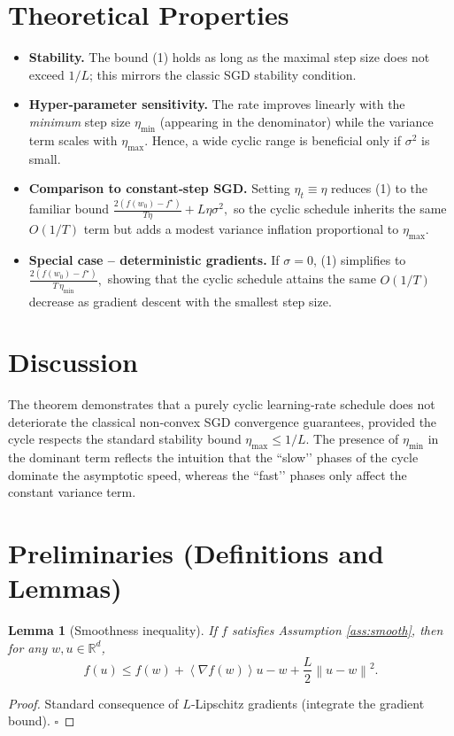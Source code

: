 \documentclass{article}
\newtheorem{lemma}{Lemma}
\newcommand{\R}{\mathbb{R}}
\newcommand{\norm}[1]{\left\lVert #1\right\rVert}
\newcommand{\inner}[1]{\left\langle #1\right\rangle}
\begin{document}
\section*{Theoretical Properties}
\begin{itemize}[leftmargin=*]
\item \textbf{Stability.} The bound (1) holds as long as the maximal step size does not exceed $1/L$; this mirrors the classic SGD stability condition.
\item \textbf{Hyper‑parameter sensitivity.} The rate improves linearly with the \emph{minimum} step size $\eta_{\min}$ (appearing in the denominator) while the variance term scales with $\eta_{\max}$. Hence, a wide cyclic range is beneficial only if $\sigma^{2}$ is small.
\item \textbf{Comparison to constant‑step SGD.} Setting $\eta_{t}\equiv\eta$ reduces (1) to the familiar bound
\(
\frac{2(f(w_{0})-f^{\star})}{T\eta}+L\eta\sigma^{2},
\)
so the cyclic schedule inherits the same $O(1/T)$ term but adds a modest variance inflation proportional to $\eta_{\max}$.
\item \textbf{Special case – deterministic gradients.} If $\sigma=0$, (1) simplifies to
\(
\frac{2(f(w_{0})-f^{\star})}{T\,\eta_{\min}},
\)
showing that the cyclic schedule attains the same $O(1/T)$ decrease as gradient descent with the smallest step size.
\end{itemize}

\section*{Discussion}
The theorem demonstrates that a purely cyclic learning‑rate schedule does not deteriorate the classical non‑convex SGD convergence guarantees, provided the cycle respects the standard stability bound $\eta_{\max}\le 1/L$. The presence of $\eta_{\min}$ in the dominant term reflects the intuition that the ``slow’’ phases of the cycle dominate the asymptotic speed, whereas the ``fast’’ phases only affect the constant variance term.

\newpage
\section*{Preliminaries (Definitions and Lemmas)}
\begin{lemma}[Smoothness inequality]\label{lem:smooth}
If $f$ satisfies Assumption \ref{ass:smooth}, then for any $w,u\in\R^{d}$,
\[
f(u)\le f(w)+\inner{\nabla f(w)}{u-w}
+\frac{L}{2}\norm{u-w}^{2}.
\tag{2}
\]
\end{lemma}
\begin{proof}
Standard consequence of $L$‑Lipschitz gradients (integrate the gradient bound). \hfill $\square$
\end{proof}
\end{document}
